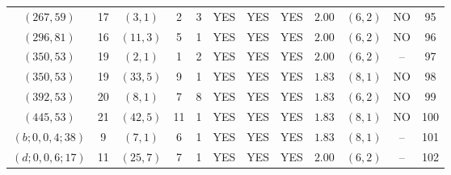 \begin{longtable}{|c|c|c|c|c|c|c|c|c|c|c|c|}
$(267,59)$ & 17 & $(3,1)$ & 2 & 3 & YES & YES & YES & $2.00$ & $(6,2)$ & NO & 95\\
$(296,81)$ & 16 & $(11,3)$ & 5 & 1 & YES & YES & YES & $2.00$ & $(6,2)$ & NO & 96\\
$(350,53)$ & 19 & $(2,1)$ & 1 & 2 & YES & YES & YES & $2.00$ & $(6,2)$ & -- & 97\\
$(350,53)$ & 19 & $(33,5)$ & 9 & 1 & YES & YES & YES & $1.83$ & $(8,1)$ & NO & 98\\
$(392,53)$ & 20 & $(8,1)$ & 7 & 8 & YES & YES & YES & $1.83$ & $(6,2)$ & NO & 99\\
$(445,53)$ & 21 & $(42,5)$ & 11 & 1 & YES & YES & YES & $1.83$ & $(8,1)$ & NO & 100\\
$(b;0,0,4;38)$ & 9 & $(7,1)$ & 6 & 1 & YES & YES & YES & $1.83$ & $(8,1)$ & -- & 101\\
$(d;0,0,6;17)$ & 11 & $(25,7)$ & 7 & 1 & YES & YES & YES & $2.00$ & $(6,2)$ & -- & 102
\end{longtable}
